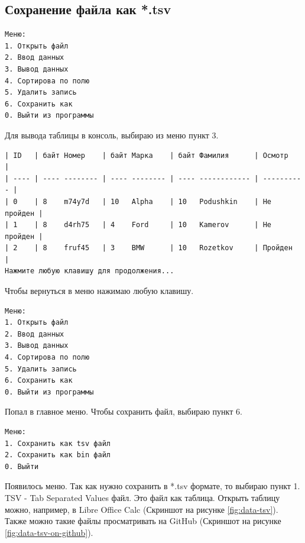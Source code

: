 \subsection{Сохранение файла как *.tsv}

\begin{tcolorbox}
\begin{verbatim}
Меню:
1. Открыть файл
2. Ввод данных       
3. Вывод данных      
4. Сортирова по полю 
5. Удалить запись    
6. Сохранить как     
0. Выйти из программы
\end{verbatim}
\end{tcolorbox}

Для вывода таблицы в консоль, выбираю из меню пункт 3.

\begin{tcolorbox}
\begin{verbatim}
| ID   | байт Номер    | байт Марка    | байт Фамилия      | Осмотр     |
| ---- | ---- -------- | ---- -------- | ---- ------------ | ---------- |
| 0    | 8    m74y7d   | 10   Alpha    | 10   Podushkin    | Не пройден |
| 1    | 8    d4rh75   | 4    Ford     | 10   Kamerov      | Не пройден |
| 2    | 8    fruf45   | 3    BMW      | 10   Rozetkov     | Пройден    |
Нажмите любую клавишу для продолжения...
\end{verbatim}
\end{tcolorbox}

Чтобы вернуться в меню нажимаю любую клавишу.

\begin{tcolorbox}
\begin{verbatim}
Меню:
1. Открыть файл
2. Ввод данных       
3. Вывод данных      
4. Сортирова по полю 
5. Удалить запись    
6. Сохранить как     
0. Выйти из программы
\end{verbatim}
\end{tcolorbox}

Попал в главное меню. Чтобы сохранить файл, выбираю пункт 6.

\begin{tcolorbox}
\begin{verbatim}
Меню:
1. Сохранить как tsv файл
2. Сохранить как bin файл
0. Выйти
\end{verbatim}
\end{tcolorbox}

Появилось меню. Так как нужно сохранить в *.tsv формате, то выбираю пункт 1. TSV - Tab Separated Values файл. Это файл как таблица. Открыть таблицу можно, например, в Libre Office Calc (Скриншот на рисунке \ref{fig:data-tsv}). Также можно такие файлы просматривать на GitHub (Скриншот на рисунке \ref{fig:data-tsv-on-github}).

